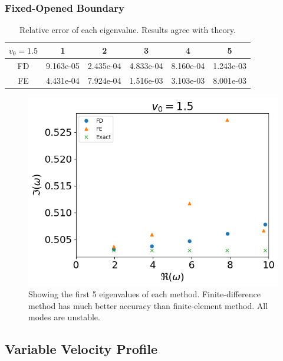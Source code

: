 \subsubsection*{Fixed-Opened Boundary}
\begin{table} [H]
	\centering
	\caption{Relative error of each eigenvalue. Results agree with theory.}
	\begin{tabular}{|c|c|c|c|c|c|}
		\hline
		$v_0=1.5$ & 1         & 2         & 3         & 4         & 5         \\
		\hline
		FD        & 9.163e-05 & 2.435e-04 & 4.833e-04 & 8.160e-04 & 1.243e-03 \\
		\hline
		FE        & 4.431e-04 & 7.924e-04 & 1.516e-03 & 3.103e-03 & 8.001e-03 \\
		\hline
	\end{tabular}
	\label{table:eigenvalue-error-fixed-opened-supersonic}
\end{table}

\begin{figure}[H]
	\centering
	\includegraphics[width=0.7\linewidth]{figures/fixed-open-constant-v-v0=1.5}
	\caption{Showing the first 5 eigenvalues of each method. Finite-difference method has much better accuracy than finite-element method. All modes are unstable.}
	\label{fig:constant-v-fixed-opened-supersonic}
\end{figure}

\subsection{Variable Velocity Profile}

